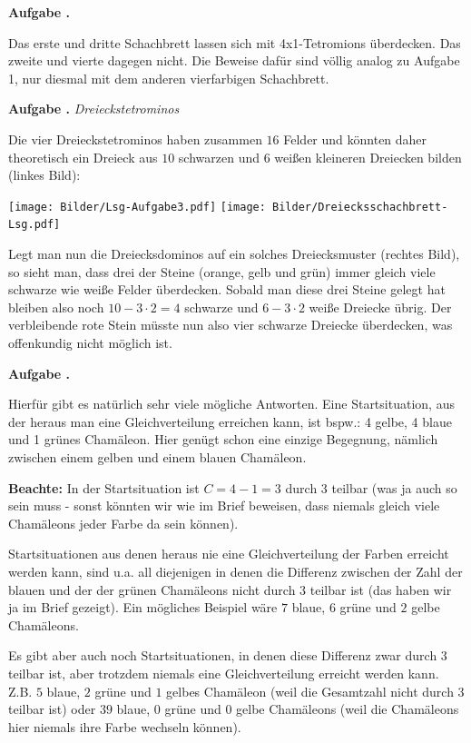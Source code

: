 \documentclass[a4paper,ngerman,12pt]{scrartcl}
\theoremstyle{definition}
\theoremstyle{plain}
\theoremstyle{remark}
\newlength{\aufgabenskip}
\newcounter{aufgabennummer}
\newenvironment{aufgabe}[1]{
	\addtocounter{aufgabennummer}{1}
	\textbf{Aufgabe \theaufgabennummer.} \emph{#1} \par
}{\vspace{\aufgabenskip}}
\begin{document}
\newpage
\begin{aufgabe}{}
	Das erste und dritte Schachbrett lassen sich mit 4x1-Tetromions überdecken. Das zweite und vierte dagegen nicht. Die Beweise dafür sind völlig analog zu Aufgabe 1, nur diesmal mit dem anderen vierfarbigen Schachbrett.
\end{aufgabe}

\begin{aufgabe}{Dreieckstetrominos}
	Die vier Dreieckstetrominos haben zusammen $16$ Felder und könnten daher theoretisch ein Dreieck aus $10$ schwarzen und $6$ weißen kleineren Dreiecken bilden (linkes Bild):
	\begin{center}
		\texttt{[image: Bilder/Lsg-Aufgabe3.pdf]} \qquad\qquad
		\texttt{[image: Bilder/Dreiecksschachbrett-Lsg.pdf]}
	\end{center}	 
	Legt man nun die Dreiecksdominos auf ein solches Dreiecksmuster (rechtes Bild), so sieht man, dass drei der Steine (orange, gelb und grün) immer gleich viele schwarze wie weiße Felder überdecken. Sobald man diese drei Steine gelegt hat bleiben also noch $10-3\cdot2=4$ schwarze und $6-3\cdot2$ weiße Dreiecke übrig. Der verbleibende rote Stein müsste nun also vier schwarze Dreiecke überdecken, was offenkundig nicht möglich ist.
\end{aufgabe}

\begin{aufgabe}{}
	Hierfür gibt es natürlich sehr viele mögliche Antworten. Eine Startsituation, aus der heraus man eine Gleichverteilung erreichen kann, ist bspw.: 4 gelbe, 4 blaue und 1 grünes Chamäleon. Hier genügt schon eine einzige Begegnung, nämlich zwischen einem gelben und einem blauen Chamäleon.
	
	\textbf{Beachte:} In der Startsituation ist $C = 4 - 1 = 3$ durch 3 teilbar (was ja auch so sein muss - sonst könnten wir wie im Brief beweisen, dass niemals gleich viele Chamäleons jeder Farbe da sein können).
	
	Startsituationen aus denen heraus nie eine Gleichverteilung der Farben erreicht werden kann, sind u.a. all diejenigen in denen die Differenz zwischen der Zahl der blauen und der der grünen Chamäleons nicht durch $3$ teilbar ist (das haben wir ja im Brief gezeigt). Ein mögliches Beispiel wäre $7$ blaue, $6$ grüne und $2$ gelbe Chamäleons.
	
	Es gibt aber auch noch Startsituationen, in denen diese Differenz zwar durch $3$ teilbar ist, aber trotzdem niemals eine Gleichverteilung erreicht werden kann. Z.B. $5$ blaue, $2$ grüne und $1$ gelbes Chamäleon (weil die Gesamtzahl nicht durch $3$ teilbar ist) oder $39$ blaue, $0$ grüne und $0$ gelbe Chamäleons (weil die Chamäleons hier niemals ihre Farbe wechseln können).
\end{aufgabe}
\end{document}
